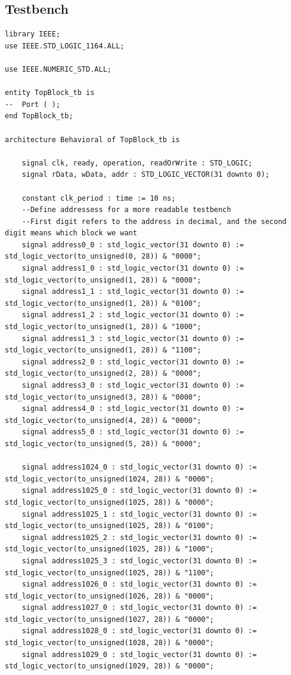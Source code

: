 \documentclass{article}
\begin{document}
\subsection{Testbench}
\begin{lstlisting}
library IEEE;
use IEEE.STD_LOGIC_1164.ALL;

use IEEE.NUMERIC_STD.ALL;

entity TopBlock_tb is
--  Port ( );
end TopBlock_tb;

architecture Behavioral of TopBlock_tb is

    signal clk, ready, operation, readOrWrite : STD_LOGIC;
    signal rData, wData, addr : STD_LOGIC_VECTOR(31 downto 0);

    constant clk_period : time := 10 ns;
    --Define addressess for a more readable testbench
    --First digit refers to the address in decimal, and the second digit means which block we want
    signal address0_0 : std_logic_vector(31 downto 0) := std_logic_vector(to_unsigned(0, 28)) & "0000";
    signal address1_0 : std_logic_vector(31 downto 0) := std_logic_vector(to_unsigned(1, 28)) & "0000";
    signal address1_1 : std_logic_vector(31 downto 0) := std_logic_vector(to_unsigned(1, 28)) & "0100";
    signal address1_2 : std_logic_vector(31 downto 0) := std_logic_vector(to_unsigned(1, 28)) & "1000";
    signal address1_3 : std_logic_vector(31 downto 0) := std_logic_vector(to_unsigned(1, 28)) & "1100";
    signal address2_0 : std_logic_vector(31 downto 0) := std_logic_vector(to_unsigned(2, 28)) & "0000";
    signal address3_0 : std_logic_vector(31 downto 0) := std_logic_vector(to_unsigned(3, 28)) & "0000";
    signal address4_0 : std_logic_vector(31 downto 0) := std_logic_vector(to_unsigned(4, 28)) & "0000";
    signal address5_0 : std_logic_vector(31 downto 0) := std_logic_vector(to_unsigned(5, 28)) & "0000";
    
    signal address1024_0 : std_logic_vector(31 downto 0) := std_logic_vector(to_unsigned(1024, 28)) & "0000";
    signal address1025_0 : std_logic_vector(31 downto 0) := std_logic_vector(to_unsigned(1025, 28)) & "0000";
    signal address1025_1 : std_logic_vector(31 downto 0) := std_logic_vector(to_unsigned(1025, 28)) & "0100";
    signal address1025_2 : std_logic_vector(31 downto 0) := std_logic_vector(to_unsigned(1025, 28)) & "1000";
    signal address1025_3 : std_logic_vector(31 downto 0) := std_logic_vector(to_unsigned(1025, 28)) & "1100";
    signal address1026_0 : std_logic_vector(31 downto 0) := std_logic_vector(to_unsigned(1026, 28)) & "0000";
    signal address1027_0 : std_logic_vector(31 downto 0) := std_logic_vector(to_unsigned(1027, 28)) & "0000";
    signal address1028_0 : std_logic_vector(31 downto 0) := std_logic_vector(to_unsigned(1028, 28)) & "0000";
    signal address1029_0 : std_logic_vector(31 downto 0) := std_logic_vector(to_unsigned(1029, 28)) & "0000";


\end{lstlisting}
\end{document}
